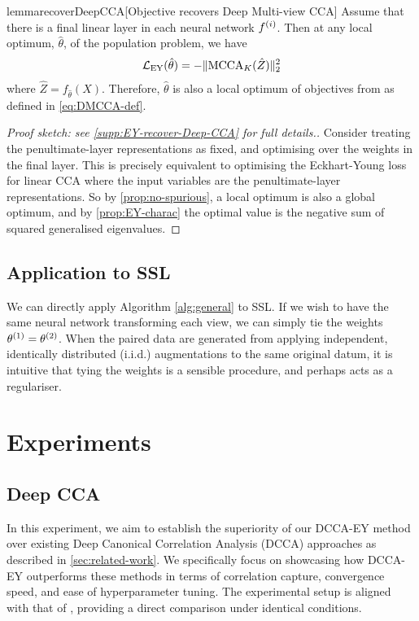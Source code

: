 \begin{restatable}{lemma}{recoverDeepCCA}[Objective recovers Deep Multi-view CCA]\label{lem:recover-DeepCCA}
Assume that there is a final linear layer in each neural network $f^{(i)}$.
Then at any local optimum, $\hat{\theta}$, of the population problem, we have
\begin{align*}
    \mathcal{L}_\text{EY}(\hat{\theta}) = - \lVert\operatorname{MCCA}_K(\hat{Z})\rVert_2^2
\end{align*}
where $\hat{Z} = f_{\hat{\theta}}(X)$.
Therefore, $\hat{\theta}$ is also a local optimum of objectives from \cite{andrew2013deep, somandepalli2019multimodal} as defined in \cref{eq:DMCCA-def}.
\end{restatable}
\begin{proof}[Proof sketch: see \cref{supp:EY-recover-Deep-CCA} for full details.]
    Consider treating the penultimate-layer representations as fixed, and optimising over the weights in the final layer. This is precisely equivalent to optimising the Eckhart-Young loss for linear CCA where the input variables are the penultimate-layer representations. So by \cref{prop:no-spurious}, a local optimum is also a global optimum, and by \cref{prop:EY-charac} the optimal value is the negative sum of squared generalised eigenvalues.
\end{proof}

\subsection{Application to SSL}
We can directly apply Algorithm \ref{alg:general} to SSL.
If we wish to have the same neural network transforming each view, we can simply tie the weights $\theta^{(1)} = \theta^{(2)}$.
When the paired data are generated from applying independent, identically distributed (i.i.d.) augmentations to the same original datum, it is intuitive that tying the weights is a sensible procedure, and perhaps acts as a regulariser.


\section{Experiments}


\subsection{Deep CCA}\label{sec:experiments-DCCA}
In this experiment, we aim to establish the superiority of our DCCA-EY method over existing Deep Canonical Correlation Analysis (DCCA) approaches as described in \cref{sec:related-work}. We specifically focus on showcasing how DCCA-EY outperforms these methods in terms of correlation capture, convergence speed, and ease of hyperparameter tuning. The experimental setup is aligned with that of \cite{wang2015stochastic}, providing a direct comparison under identical conditions.

